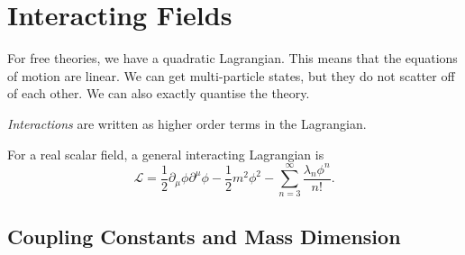 \chapter{Interacting Fields}%
\label{cha:interacting_fields}

For free theories, we have a quadratic Lagrangian.
This means that the equations of motion are linear.
We can get multi-particle states, but they do not scatter off of each other.
We can also exactly quantise the theory.

\emph{Interactions} are written as higher order terms in the Lagrangian.
\begin{example}[]
  For a real scalar field, a general interacting Lagrangian is
  \begin{equation}
    \mathcal{L} = \frac{1}{2} \partial_\mu \phi \partial^\mu \phi - \frac{1}{2} m^2 \phi^2 - \sum_{n = 3}^\infty \frac{\lambda_n \phi^n}{n!}.
  \end{equation}
\end{example}

\section{Coupling Constants and Mass Dimension}%
\label{sec:coupling_constants_and_mass_dimension}

